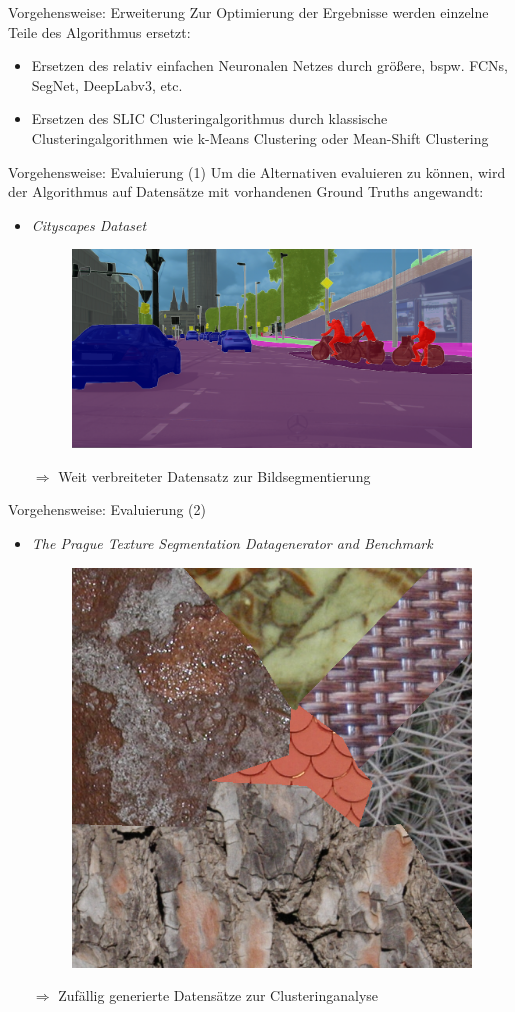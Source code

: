 \documentclass[9pt]{beamer}
\begin{document}
\begin{frame}{Vorgehensweise: Erweiterung}
Zur Optimierung der Ergebnisse werden einzelne Teile des Algorithmus ersetzt:
\begin{itemize}
	\item Ersetzen des relativ einfachen Neuronalen Netzes durch größere, bspw. FCNs, SegNet, DeepLabv3, etc.
	\item Ersetzen des SLIC Clusteringalgorithmus durch klassische Clusteringalgorithmen wie k-Means Clustering oder Mean-Shift Clustering
\end{itemize}
\end{frame}

\begin{frame}{Vorgehensweise: Evaluierung (1)}
Um die Alternativen evaluieren zu können, wird der Algorithmus auf Datensätze mit vorhandenen Ground Truths angewandt:
\medskip
\begin{itemize}
	\item \textit{Cityscapes Dataset}\footnotemark[1]
	\begin{figure}[H]
		\includegraphics[width=.7\textwidth,keepaspectratio]{koeln00.png}
	\end{figure}
	\item[$\Rightarrow$] Weit verbreiteter Datensatz zur Bildsegmentierung
\end{itemize}
\end{frame}
\begin{frame}{Vorgehensweise: Evaluierung (2)}
\begin{itemize}
	\item \textit{The Prague Texture Segmentation Datagenerator and Benchmark}\footnotemark[1]
	\begin{figure}[H]
		\includegraphics[width=.4\textwidth,keepaspectratio]{prague.png}
	\end{figure}
	\item[$\Rightarrow$] Zufällig generierte Datensätze zur Clusteringanalyse
\end{itemize}
\end{frame}
\end{document}
